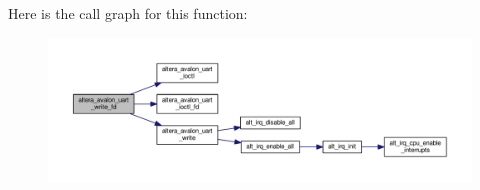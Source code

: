 Here is the call graph for this function\+:
\nopagebreak
\begin{figure}[H]
\begin{center}
\leavevmode
\includegraphics[width=350pt]{dc/d55/altera__avalon__uart__fd_8h_af1fc2692b255d42c730398721025fe4f_cgraph}
\end{center}
\end{figure}


